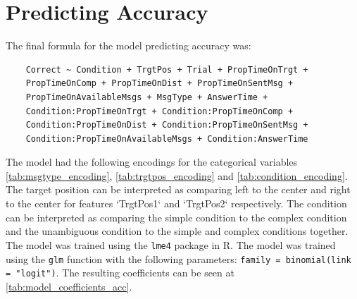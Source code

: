 \section{Predicting Accuracy}
\label{sec:accuracy_model}

The final formula for the model predicting accuracy was:
\begin{verbatim}
    Correct ~ Condition + TrgtPos + Trial + PropTimeOnTrgt +
    PropTimeOnComp + PropTimeOnDist + PropTimeOnSentMsg + 
    PropTimeOnAvailableMsgs + MsgType + AnswerTime + 
    Condition:PropTimeOnTrgt + Condition:PropTimeOnComp +
    Condition:PropTimeOnDist + Condition:PropTimeOnSentMsg +
    Condition:PropTimeOnAvailableMsgs + Condition:AnswerTime
\end{verbatim}
The model had the following encodings for the categorical variables \autoref{tab:msgtype_encoding}, \autoref{tab:trgtpos_encoding} and \autoref{tab:condition_encoding}. The target position can be interpreted as comparing left to the center and right to the center for features `TrgtPos1` and `TrgtPos2` respectively. The condition can be interpreted as comparing the simple condition to the complex condition and the unambiguous condition to the simple and complex conditions together. The model was trained using the \texttt{lme4} package in R. The model was trained using the \texttt{glm} function with the following parameters: \texttt{family = binomial(link = "logit")}. The resulting coefficients can be seen at \autoref{tab:model_coefficients_acc}. 

